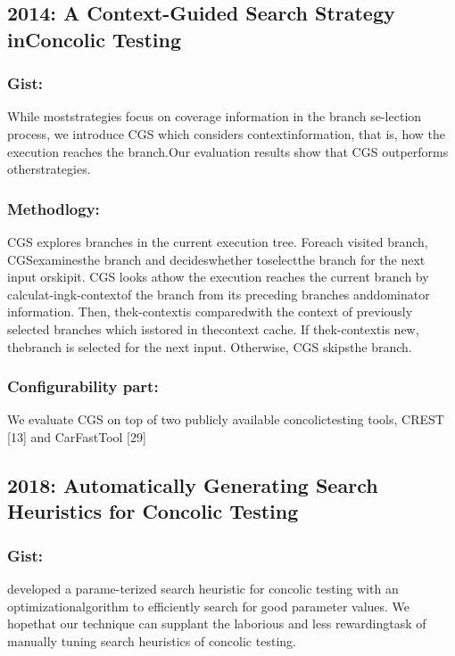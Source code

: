 \documentclass[	runningheads,
				a4paper]{llncs}
\begin{document}
\subsection{2014: A Context-Guided Search Strategy inConcolic Testing}
\subsubsection{Gist:}
While moststrategies  focus  on  coverage  information  in  the  branch  se-lection process, we introduce CGS which considers contextinformation, that is, how the execution reaches the branch.Our  evaluation  results  show  that  CGS  outperforms  otherstrategies. 

\subsubsection{Methodlogy:}
CGS explores branches in the current execution tree.  Foreach visited branch, CGSexaminesthe branch and decideswhether toselectthe branch for the next input orskipit. CGS looks athow the execution reaches the current branch by calculat-ingk-contextof the branch from its preceding branches anddominator information. Then, thek-contextis comparedwith  the  context  of  previously  selected  branches  which  isstored  in  thecontext  cache.   If  thek-contextis  new,  thebranch is selected for the next input.  Otherwise, CGS skipsthe branch.

\subsubsection{Configurability part:}
We evaluate CGS on top of two publicly available concolictesting tools, CREST [13] and CarFastTool [29]


\subsection{2018: Automatically Generating Search Heuristics for Concolic Testing}
\subsubsection{Gist:}
developed a parame-terized search heuristic for concolic testing with an optimizationalgorithm to efficiently search for good parameter values. We hopethat our technique can supplant the laborious and less rewardingtask of manually tuning search heuristics of concolic testing.
\end{document}
